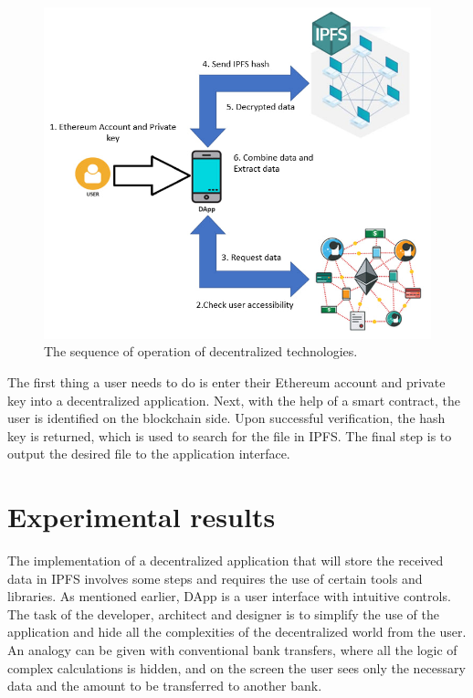 \documentclass[10pt,conference,a4paper]{IEEEtran_EDM}
\begin{document}
\begin{figure}
\centerline{\includegraphics[scale=0.67]{fig2.png}}
\caption{The sequence of operation of decentralized technologies.}
\label{Sequence}
\end{figure}

The first thing a user needs to do is enter their Ethereum account and private key into a decentralized application.
Next, with the help of a smart contract, the user is identified on the blockchain side.
Upon successful verification, the hash key is returned, which is used to search for the file in IPFS.
The final step is to output the desired file to the application interface.

\section{Experimental results}
The implementation of a decentralized application that will store the received data in IPFS involves some steps and requires the use of certain tools and libraries.
As mentioned earlier, DApp is a user interface with intuitive controls.
The task of the developer, architect and designer is to simplify the use of the application and hide all the complexities of the decentralized world from the user.
An analogy can be given with conventional bank transfers, where all the logic of complex calculations is hidden, and on the screen the user sees only the necessary data and the amount to be transferred to another bank.
\end{document}
